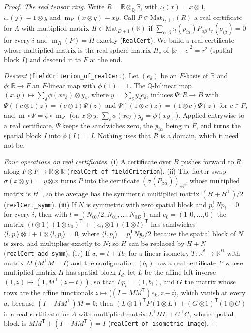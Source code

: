 \documentclass[11pt]{article}
\theoremstyle{definition}
\theoremstyle{remark}
\newcommand{\R}{\mathbb{R}}
\newcommand{\Q}{\mathbb{Q}}
\newcommand{\B}{B}
\DeclareMathOperator{\m}{m}
\begin{document}
\begin{proof}
\emph{The real tensor ring.} Write $R = \R \otimes_\Q \R$, with $\iota_l(x) = x \otimes 1$,
$\iota_r(y) = 1 \otimes y$ and $\m_R(x \otimes y) = xy$. Call $P \in \mathrm{Mat}_{D+1}(R)$ a real
certificate for $A$ with multiplied matrix $H \in \mathrm{Mat}_{D+1}(\R)$ if
$\sum_{\alpha,\beta} \iota_l(p_{i\alpha}) P_{\alpha\beta}\, \iota_r(p_{i\beta}) = 0$ for every $i$ and
$\m_R(P) = H$ exactly (\texttt{RealCert}). We build a real certificate whose multiplied matrix is the
real sphere matrix $H_c$ of $|x - c|^2 = r^2$ (spatial block $I$) and descend it to $F$ at the end.

\emph{Descent} (\texttt{fieldCriterion\_of\_realCert}). Let $(e_\delta)$ be an $F$-basis of $\R$ and
$\phi \colon \R \to F$ an $F$-linear map with $\phi(1) = 1$. The $\Q$-bilinear map
$(x, y) \mapsto \sum_\delta \phi(x e_\delta) \otimes y_\delta$, where $y = \sum_\delta y_\delta e_\delta$,
induces $\Psi \colon R \to \B$ with $\Psi((c \otimes 1) z) = (c \otimes 1)\Psi(z)$ and
$\Psi((1 \otimes c) z) = (1 \otimes c)\Psi(z)$ for $c \in F$, and $\m \circ \Psi = \phi \circ \m_R$ (on
$x \otimes y$: $\sum_\delta \phi(x e_\delta) y_\delta = \phi(xy)$). Applied entrywise to a real certificate,
$\Psi$ keeps the sandwiches zero, the $p_{i\alpha}$ being in $F$, and turns the spatial block $I$ into
$\phi(I) = I$. Nothing uses that $\B$ is a domain, which it need not be.

\emph{Four operations on real certificates.} (i) A certificate over $\B$ pushes forward to $R$ along
$F \otimes F \to \R \otimes \R$ (\texttt{realCert\_of\_fieldCriterion}). (ii) The factor swap
$\sigma(x \otimes y) = y \otimes x$ turns $P$ into the certificate $(\sigma(P_{\beta\alpha}))_{\alpha\beta}$,
whose multiplied matrix is $H^{\mathsf T}$, so the average has the symmetric multiplied matrix
$(H + H^{\mathsf T})/2$ (\texttt{realCert\_symm}). (iii) If $N$ is symmetric with zero spatial block and
$p_i^{\mathsf T} N p_i = 0$ for every $i$, then with $l = (N_{00}/2, N_{01}, \dots, N_{0D})$ and
$e_0 = (1, 0, \dots, 0)$ the matrix $(l \otimes 1)(1 \otimes e_0)^{\mathsf T} + (e_0 \otimes 1)(1 \otimes l)^{\mathsf T}$
has sandwiches $\langle l, p_i\rangle \otimes 1 + 1 \otimes \langle l, p_i\rangle = 0$, where
$\langle l, p_i\rangle = p_i^{\mathsf T} N p_i / 2$ because the spatial block of $N$ is zero, and multiplies
exactly to $N$; so $H$ can be replaced by $H + N$ (\texttt{realCert\_add\_symm}).
(iv) If $a_i = t + T b_i$ for a linear isometry $T \colon \R^d \to \R^D$ with matrix $M$
($M^{\mathsf T} M = I$) and the configuration $(b_i)$ has a real certificate $P$ whose multiplied matrix $H$ has spatial
block $I_d$,
let $L$ be the affine left inverse $(1, z) \mapsto (1, M^{\mathsf T}(z - t))$, so that
$L p_i = (1, b_i)$, and $G$ the matrix whose rows are the affine functionals
$z \mapsto \langle (I - MM^{\mathsf T}) e_k, z - t\rangle$, which vanish at every $a_i$ because
$(I - MM^{\mathsf T}) M = 0$; then $(L \otimes 1)^{\mathsf T} P (1 \otimes L) + (G \otimes 1)^{\mathsf T}(1 \otimes G)$
is a real certificate for $A$ with multiplied matrix $L^{\mathsf T} H L + G^{\mathsf T} G$, whose spatial
block is $MM^{\mathsf T} + (I - MM^{\mathsf T}) = I$ (\texttt{realCert\_of\_isometric\_image}).


\end{proof}
\end{document}
